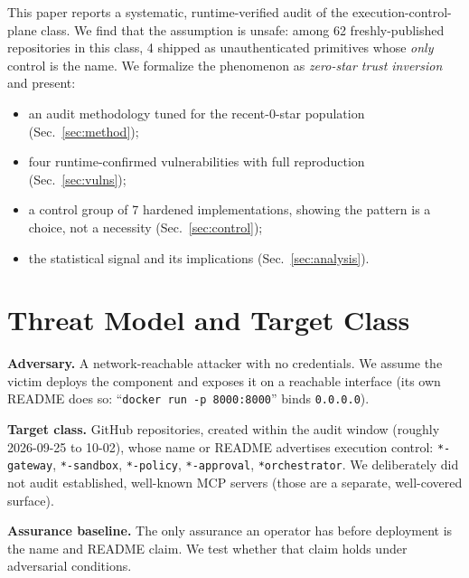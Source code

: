 \documentclass{llncs}
\newcommand{\secref}[1]{Sec.~\ref{#1}}
\begin{document}
This paper reports a systematic, runtime-verified audit of the execution-control-plane class. We find that the assumption is unsafe: among 62 freshly-published repositories in this class, 4 shipped as unauthenticated primitives whose \emph{only} control is the name. We formalize the phenomenon as \emph{zero-star trust inversion} and present:
\begin{itemize}
\item an audit methodology tuned for the recent-0-star population (\secref{sec:method});
\item four runtime-confirmed vulnerabilities with full reproduction (\secref{sec:vulns});
\item a control group of 7 hardened implementations, showing the pattern is a choice, not a necessity (\secref{sec:control});
\item the statistical signal and its implications (\secref{sec:analysis}).
\end{itemize}

\section{Threat Model and Target Class}\label{sec:model}
\textbf{Adversary.} A network-reachable attacker with no credentials. We assume the victim deploys the component and exposes it on a reachable interface (its own README does so: ``\texttt{docker run -p 8000:8000}'' binds \texttt{0.0.0.0}).

\textbf{Target class.} GitHub repositories, created within the audit window (roughly 2026-09-25 to 10-02), whose name or README advertises execution control: \texttt{*-gateway}, \texttt{*-sandbox}, \texttt{*-policy}, \texttt{*-approval}, \texttt{*orchestrator}. We deliberately did not audit established, well-known MCP servers (those are a separate, well-covered surface).

\textbf{Assurance baseline.} The only assurance an operator has before deployment is the name and README claim. We test whether that claim holds under adversarial conditions.
\end{document}
